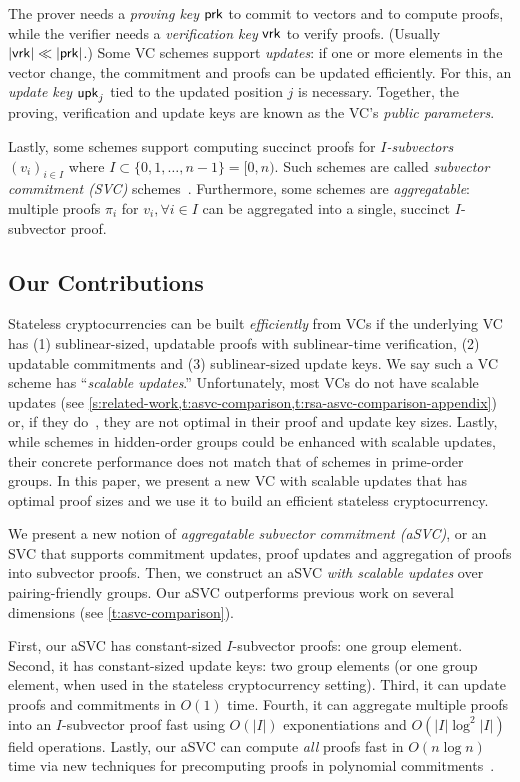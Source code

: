 The prover needs a \textit{proving key} $\mathsf{prk}$ to commit to vectors and to compute proofs, while the verifier needs a \textit{verification key} $\mathsf{vrk}$ to verify proofs.
(Usually $|\mathsf{vrk}| \ll |\mathsf{prk}|$.)
Some VC schemes support \textit{updates}: if one or more elements in the vector change, the commitment and proofs can be updated efficiently.
For this, an \textit{update key} $\mathsf{upk}_j$ tied to the updated position $j$ is necessary.
Together, the proving, verification and update keys are known as the VC's \textit{public parameters}.

Lastly, some schemes support computing succinct proofs for \textit{$I$-subvectors} $(v_i)_{i\in I}$ where $I\subset \{0,1,\dots,n-1\}=[0,n)$.
Such schemes are called \textit{subvector commitment (SVC)} schemes~\cite{LM19}.
Furthermore, some schemes are \textit{aggregatable}: multiple proofs $\pi_i$ for $v_i, \forall i \in I$ can be aggregated into a single, succinct $I$-subvector proof.

\subsection{Our Contributions}
Stateless cryptocurrencies can be built \textit{efficiently} from VCs if the underlying VC has (1) sublinear-sized, updatable proofs with sublinear-time verification, (2) updatable commitments and (3) sublinear-sized update keys.
We say such a VC scheme has ``\textit{scalable updates}.''
Unfortunately, most VCs do not have scalable updates (see \cref{s:related-work,t:asvc-comparison,t:rsa-asvc-comparison-appendix}) or, if they do~\cite{CPZ18,Tomescu20}, they are not optimal in their proof and update key sizes.
Lastly, while schemes in hidden-order groups could be enhanced with scalable updates, their concrete performance does not match that of schemes in prime-order groups.
In this paper, we present a new VC with scalable updates that has optimal proof sizes and we use it to build an efficient stateless cryptocurrency.

We present a new notion of \textit{aggregatable subvector commitment (aSVC)}, or an SVC that supports commitment updates, proof updates and aggregation of proofs into subvector proofs.
Then, we construct an aSVC \textit{with scalable updates} over pairing-friendly groups.
Our aSVC outperforms previous work on several dimensions (see \cref{t:asvc-comparison}).

First, our aSVC has constant-sized $I$-subvector proofs: one group element.
Second, it has constant-sized update keys: two group elements (or one group element, when used in the stateless cryptocurrency setting).
Third, it can update proofs and commitments in $O(1)$ time.
Fourth, it can aggregate multiple proofs into an $I$-subvector proof fast using $O(|I|)$ exponentiations and $O(|I|\log^2{|I|})$ field operations.
Lastly, our aSVC can compute \textit{all} proofs fast in $O(n\log{n})$ time via new techniques for precomputing proofs in polynomial commitments~\cite{FK20}.

